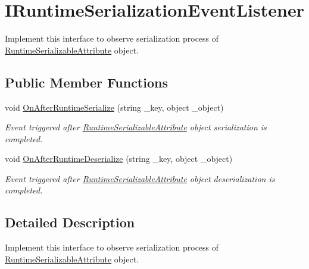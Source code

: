 \hypertarget{interface_voxel_busters_1_1_runtime_serialization_1_1_i_runtime_serialization_event_listener}{}\section{I\+Runtime\+Serialization\+Event\+Listener}
\label{interface_voxel_busters_1_1_runtime_serialization_1_1_i_runtime_serialization_event_listener}


Implement this interface to observe serialization process of \hyperlink{class_voxel_busters_1_1_runtime_serialization_1_1_runtime_serializable_attribute}{Runtime\+Serializable\+Attribute} object.  


\subsection*{Public Member Functions}
\begin{DoxyCompactItemize}
\item 
void \hyperlink{interface_voxel_busters_1_1_runtime_serialization_1_1_i_runtime_serialization_event_listener_a110fd82847987d42f8fabae783017b7a}{On\+After\+Runtime\+Serialize} (string \+\_\+key, object \+\_\+object)
\begin{DoxyCompactList}\small\item\em Event triggered after \hyperlink{class_voxel_busters_1_1_runtime_serialization_1_1_runtime_serializable_attribute}{Runtime\+Serializable\+Attribute} object serialization is completed. \end{DoxyCompactList}\item 
void \hyperlink{interface_voxel_busters_1_1_runtime_serialization_1_1_i_runtime_serialization_event_listener_afa46649cd09a5c970644a669757c4986}{On\+After\+Runtime\+Deserialize} (string \+\_\+key, object \+\_\+object)
\begin{DoxyCompactList}\small\item\em Event triggered after \hyperlink{class_voxel_busters_1_1_runtime_serialization_1_1_runtime_serializable_attribute}{Runtime\+Serializable\+Attribute} object deserialization is completed. \end{DoxyCompactList}\end{DoxyCompactItemize}


\subsection{Detailed Description}
Implement this interface to observe serialization process of \hyperlink{class_voxel_busters_1_1_runtime_serialization_1_1_runtime_serializable_attribute}{Runtime\+Serializable\+Attribute} object. 




